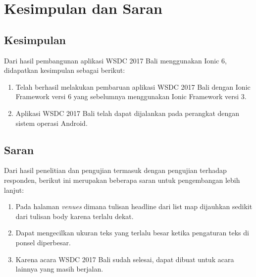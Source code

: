 \chapter{Kesimpulan dan Saran}
\label{chap:kesimpulanSaran}

\section{Kesimpulan} 
\label{sec:kesimpulan}

Dari hasil pembangunan aplikasi WSDC 2017 Bali menggunakan Ionic 6, didapatkan kesimpulan sebagai berikut:

\begin{enumerate}
	\item Telah berhasil melakukan pembaruan aplikasi WSDC 2017 Bali dengan Ionic Framework versi 6 yang sebelumnya menggunakan Ionic Framework versi 3.
	\item Aplikasi WSDC 2017 Bali telah dapat dijalankan pada perangkat dengan sistem operasi Android.
\end{enumerate}

\section{Saran} 
\label{sec:saran}

Dari hasil penelitian dan pengujian termasuk dengan pengujian terhadap responden, berikut ini merupakan beberapa saran untuk pengembangan lebih lanjut:

\begin{enumerate}
	\item Pada halaman \textit{venues} dimana tulisan headline dari list map dijauhkan sedikit dari tulisan body karena terlalu dekat.
	\item Dapat mengecilkan ukuran teks yang terlalu besar ketika pengaturan teks di ponsel diperbesar.
	\item Karena acara WSDC 2017 Bali sudah selesai, dapat dibuat untuk acara lainnya yang masih berjalan.
\end{enumerate}